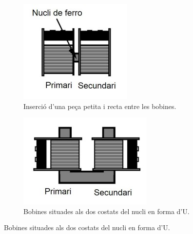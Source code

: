 \documentclass[a4paper,10.5pt]{report}
\begin{document}
\begin{figure}[h]
	\centering
	\begin{subfigure}[b]{0.25\textwidth}
		\centering
		\includegraphics[width=\textwidth]{42a.jpg}
		\caption{Inserció d'una peça petita i recta entre les bobines.}
		\label{fig4:2a}
	\end{subfigure}
	\hspace{0.5cm}
	\begin{subfigure}[b]{0.25\textwidth}
		\centering
		\includegraphics[width=\textwidth]{42b.jpg}
		\caption{Bobines situades als dos costats del nucli en forma d'U.}

\end{subfigure}
\end{figure}
\end{document}
